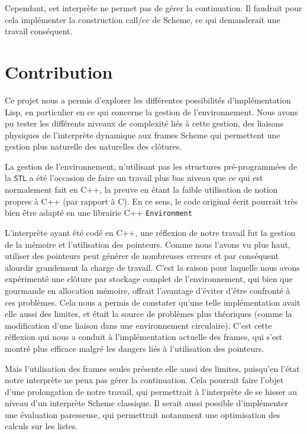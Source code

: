 \documentclass[a4paper,11pt]{article}
\begin{document}
 Cependant, cet interprète ne permet pas de gérer la continuation. Il faudrait pour 
 cela implémenter la construction call/cc de Scheme, ce qui demanderait une travail 
 conséquent.


\section{Contribution}

Ce projet nous a permis d'explorer les différentes possibilités d'implémentation 
Lisp, en particulier en ce qui concerne la gestion de l'environnement. Nous avons pu 
tester les différents niveaux de complexité liés à cette gestion, des liaisons physiques
de l'interprète dynamique aux frames Scheme qui permettent une gestion plus naturelle des
naturelles des clôtures.

La gestion de l'environnement, n'utilisant pas les structures pré-programmées de
la \texttt{STL} a été l'occasion de faire un travail plus bas niveau que ce qui
est normalement fait en C++, la preuve en étant la faible utilisation de
notion propres à C++ (par rapport à C). En ce sens, le code original écrit
pourrait très bien être adapté en une librairie C++ \texttt{Environment}

L'interprète ayant été codé en C++, une réflexion de notre travail fut la gestion de la 
mémoire et l’utilisation des pointeurs. Comme nous l'avons vu plus haut, utiliser 
des pointeurs peut générer de nombreuses erreurs et par conséquent alourdir grandement la charge 
de travail. C'est la raison pour laquelle nous avons expérimenté une clôture par stockage 
complet de l'environnement, qui bien que gourmande en allocation mémoire, offrait l'avantage 
d'éviter d'être confronté à ces problèmes. Cela nous a permis de constater qu'une telle 
implémentation avait elle aussi des limites, et était la source de problèmes plus théoriques 
(comme la modification d'une liaison dans une environnement circulaire). C'est cette réflexion 
qui nous a conduit à l'implémentation actuelle des frames, qui s'est montré plus efficace 
malgré les dangers liés à l'utilisation des pointeurs.

Mais l'utilisation des frames seules présente elle aussi des limites, puisqu'en l'état 
notre interprète ne peux pas gérer la continuation. Cela pourrait faire l'objet d'une 
prolongation de notre travail, qui permettrait à l'interprète de se hisser au niveau 
d'un interprète Scheme classique. Il serait aussi possible d'implémenter une évaluation 
paresseuse, qui permettrait notamment une optimisation des calculs sur les listes.
\end{document}

